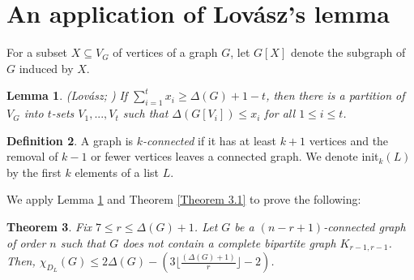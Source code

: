 \documentclass[12pt,reqno,a4paper]{amsart}
\theoremstyle{definition}
\newtheorem{defn}{Definition}[section]
\newtheorem{thm}[defn]{Theorem}
\newtheorem{lem}[defn]{Lemma}
\begin{document}
\section{An application of Lov\'{a}sz's lemma}
For a subset $X\subseteq V_{G}$ of vertices of a graph $G$, let $G[X]$ denote the subgraph of $G$ induced by $X$. 

\begin{lem}\label{Lemma 4.1}{\em (Lov\'{a}sz; \cite{Lov1966})}
{\em If $\sum_{i=1}^{t} x_{i}\geq \Delta(G)+1-t$, then there is a partition of $V_{G}$ into $t$-sets $V_{1},...,V_{t}$ such that $\Delta(G[V_{i}])\leq x_{i}$ for all $1\leq i\leq t$.}     
\end{lem}

\begin{defn}\label{Definition 4.2}
A graph is {\em $k$-connected} if it has at least $k+1$ vertices and the removal of $k-1$ or fewer vertices leaves a connected graph. We denote init$_{k}(L)$ by the first $k$ elements of a list $L$.
\end{defn}

We apply Lemma \ref{Lemma 4.1} and Theorem \ref{Theorem 3.1} to prove the following:


\begin{thm}\label{Theorem 4.3}{\em Fix $7\leq r\leq \Delta(G)+1$. Let $G$ be a $(n-r+1)$-connected graph of order $n$ such that $G$ does not contain a complete bipartite graph $K_{r-1,r-1}$.
Then, $\chi_{D_{L}}(G)\leq 2\Delta(G)-  (3\lfloor\frac{(\Delta(G)+1)}{r}\rfloor-2)$.
}
\end{thm}
\end{document}
